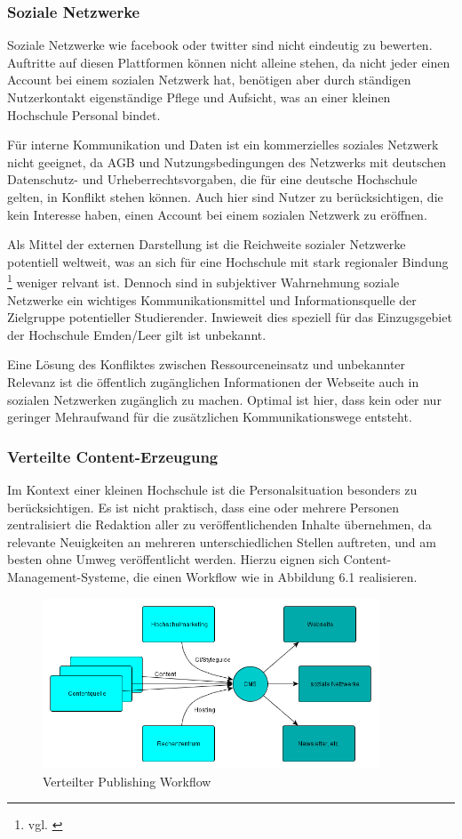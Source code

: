 \subsubsection{Soziale Netzwerke}
Soziale Netzwerke wie facebook oder twitter sind nicht eindeutig zu bewerten. Auftritte auf diesen Plattformen können nicht alleine stehen, da nicht jeder einen Account bei einem sozialen Netzwerk hat, benötigen aber durch ständigen Nutzerkontakt eigenständige Pflege und Aufsicht, was an einer kleinen Hochschule Personal bindet.

Für interne Kommunikation und Daten ist ein kommerzielles soziales Netzwerk nicht geeignet, da AGB und Nutzungsbedingungen des Netzwerks mit deutschen Datenschutz- und Urheberrechtsvorgaben, die für eine deutsche Hochschule gelten, in Konflikt stehen können. Auch hier sind Nutzer zu berücksichtigen, die kein Interesse haben, einen Account bei einem sozialen Netzwerk zu eröffnen.

Als Mittel der externen Darstellung ist die Reichweite sozialer Netzwerke potentiell weltweit, was an sich für eine Hochschule mit stark regionaler Bindung \footnote{vgl. \cite{hsel_leitbild_url}} weniger relvant ist. Dennoch sind in subjektiver Wahrnehmung soziale Netzwerke ein wichtiges Kommunikationsmittel und Informationsquelle der Zielgruppe potentieller Studierender. Inwieweit dies speziell für das Einzugsgebiet der Hochschule Emden/Leer gilt ist unbekannt.

Eine Lösung des Konfliktes zwischen Ressourceneinsatz und unbekannter Relevanz ist die öffentlich zugänglichen Informationen der Webseite auch in sozialen Netzwerken zugänglich zu machen. Optimal ist hier, dass kein oder nur geringer Mehraufwand für die zusätzlichen Kommunikationswege entsteht.

\subsubsection{Verteilte Content-Erzeugung}
Im Kontext einer kleinen Hochschule ist die Personalsituation besonders zu berücksichtigen. Es ist nicht praktisch, dass eine oder mehrere Personen zentralisiert die Redaktion aller zu veröffentlichenden Inhalte übernehmen, da relevante Neuigkeiten an mehreren unterschiedlichen Stellen auftreten, und am besten ohne Umweg veröffentlicht werden. Hierzu eignen sich Content-Management-Systeme, die einen Workflow wie in Abbildung 6.1 realisieren.

\begin{figure}[h!]
	\centering
	\includegraphics[width=10cm]{kapitel/gruppe3/bilder/verteilter_publishing_workflow}
	\caption{Verteilter Publishing Workflow}
	\label{fig_publishing_workflow}
\end{figure}

